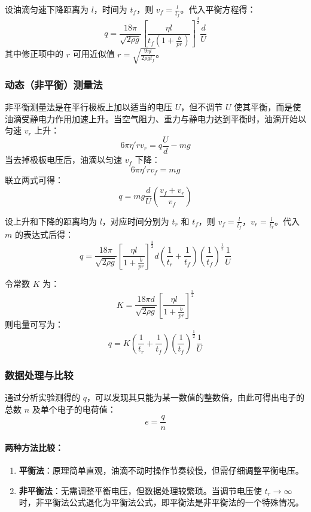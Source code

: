 \documentclass[11pt]{article}
\begin{document}
设油滴匀速下降距离为 $l$，时间为 $t_f$，则 $v_f = \frac{l}{t_f}$。代入平衡方程得：
\[ q = \frac{18\pi}{\sqrt{2\rho g}} \left[ \frac{\eta l}{t_f \left( 1 + \frac{b}{pr} \right)} \right]^{\frac{3}{2}} \frac{d}{U} \]
其中修正项中的 $r$ 可用近似值 $r = \sqrt{\frac{9\eta l}{2\rho g t_f}}$。

\subsubsection{动态（非平衡）测量法}

非平衡测量法是在平行极板上加以适当的电压 $U$，但不调节 $U$ 使其平衡，而是使油滴受静电力作用加速上升。当空气阻力、重力与静电力达到平衡时，油滴开始以匀速 $v_r$ 上升：
\[ 6\pi\eta' r v_r = q\frac{U}{d} - mg \]
当去掉极板电压后，油滴以匀速 $v_f$ 下降：
\[ 6\pi\eta' r v_f = mg \]
联立两式可得：
\[ q = mg \frac{d}{U} \left( \frac{v_f + v_r}{v_f} \right) \]

设上升和下降的距离均为 $l$，对应时间分别为 $t_r$ 和 $t_f$，则 $v_f = \frac{l}{t_f}$，$v_r = \frac{l}{t_r}$。代入 $m$ 的表达式后得：
\[ q = \frac{18\pi}{\sqrt{2\rho g}} \left[ \frac{\eta l}{1 + \frac{b}{pr}} \right]^{\frac{3}{2}} d \left( \frac{1}{t_r} + \frac{1}{t_f} \right) \left( \frac{1}{t_f} \right)^{\frac{1}{2}} \frac{1}{U} \]

令常数 $K$ 为：
\[ K = \frac{18\pi d}{\sqrt{2\rho g}} \left[ \frac{\eta l}{1 + \frac{b}{pr}} \right]^{\frac{3}{2}} \]
则电量可写为：
\[ q = K \left( \frac{1}{t_r} + \frac{1}{t_f} \right) \left( \frac{1}{t_f} \right)^{\frac{1}{2}} \frac{1}{U} \]

\subsubsection{数据处理与比较}

通过分析实验测得的 $q$，可以发现其只能为某一数值的整数倍，由此可得出电子的总数 $n$ 及单个电子的电荷值：
\[ e = \frac{q}{n} \]

\paragraph{两种方法比较：}
\begin{enumerate}
    \item \textbf{平衡法}：原理简单直观，油滴不动时操作节奏较慢，但需仔细调整平衡电压。
    \item \textbf{非平衡法}：无需调整平衡电压，但数据处理较繁琐。当调节电压使 $t_r \to \infty$ 时，非平衡法公式退化为平衡法公式，即平衡法是非平衡法的一个特殊情况。
\end{enumerate}
\end{document}
